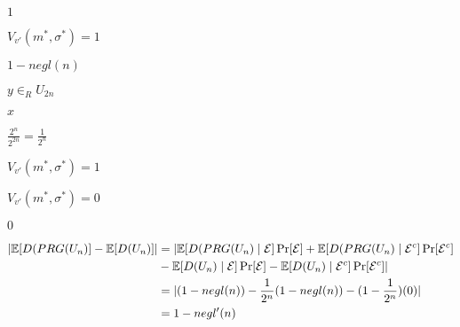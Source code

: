 \documentclass[10pt]{book}
\begin{document}
\begin{mdSnippets}
\begin{mdInlineSnippet}[c4ca4238a0b923820dcc509a6f75849b]%
$1$\end{mdInlineSnippet}%
\begin{mdInlineSnippet}[232d4149a9ef6213e800c018288a3b8b]%
$V_{v'}(m^*,\sigma^*) = 1$\end{mdInlineSnippet}%
\begin{mdInlineSnippet}%
$1 - negl(n)$\end{mdInlineSnippet}%
\begin{mdInlineSnippet}[7d9a1d25e8a561118545918b319c334b]%
$y \in_R U_{2n}$\end{mdInlineSnippet}%
\begin{mdInlineSnippet}[9dd4e461268c8034f5c8564e155c67a6]%
$x$\end{mdInlineSnippet}%
\begin{mdInlineSnippet}[ad1709560735f29c77b9c919a0b3d82e]%
$\frac{2^n}{2^{2n}} = \frac{1}{2^n}$\end{mdInlineSnippet}%
\begin{mdInlineSnippet}[232d4149a9ef6213e800c018288a3b8b]%
$V_{v'}(m^*,\sigma^*) = 1$\end{mdInlineSnippet}%
\begin{mdInlineSnippet}[b21f612b0467f9ffaf1a70941198c740]%
$V_{v'}(m^*,\sigma^*) = 0$\end{mdInlineSnippet}%
\begin{mdInlineSnippet}%
$0$\end{mdInlineSnippet}%
\begin{mdDisplaySnippet}%
\[%
\begin{aligned}
|\E[D(PRG(U_n)] - \E[D(U_n)]| &=  |\E[D(PRG(U_n) \mid \mathcal{E}]\Pr[\mathcal{E}] + \E[D(PRG(U_n) \mid \mathcal{E}^c]\Pr[\mathcal{E}^c] \\
&-\E[D(U_n) \mid \mathcal{E}]\Pr[\mathcal{E}]- \E[D(U_n) \mid \mathcal{E}^c]\Pr[\mathcal{E}^c]| \\
&= |(1-negl(n)) - \frac{1}{2^n}(1 - negl(n)) - (1 - \frac{1}{2^n})(0)| \\
&= 1 - negl'(n)
\end{aligned}
\]%
\end{mdDisplaySnippet}%

\end{mdSnippets}
\end{document}
